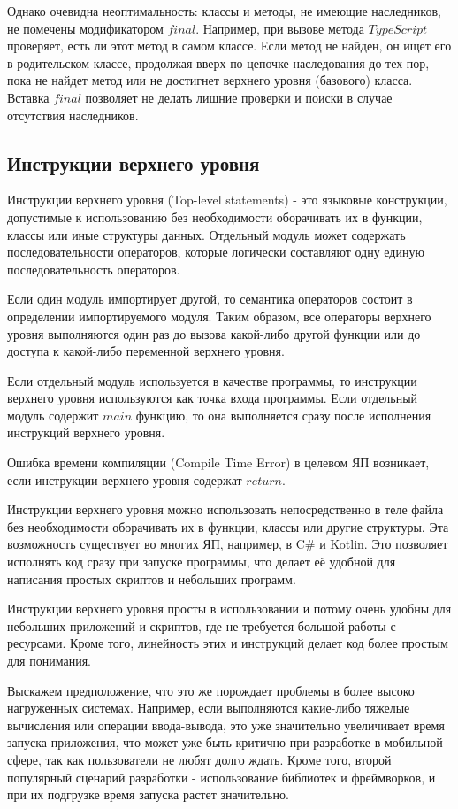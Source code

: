 \documentclass{mipt-thesis-bs}
\begin{document}
Однако очевидна неоптимальность: классы  и методы, не имеющие наследников,
не помечены модификатором $final$. Например, при вызове метода $TypeScript$ проверяет,
есть ли этот метод
в самом классе. Если метод не найден, он ищет его в родительском классе,
продолжая вверх по цепочке наследования до тех пор, пока не найдет метод
или не достигнет верхнего уровня (базового) класса. Вставка $final$ позволяет
не делать лишние проверки и поиски в случае отсутствия наследников.


\subsection{Инструкции верхнего уровня}

Инструкции верхнего уровня (Top-level statements) - это языковые конструкции, допустимые
к использованию без необходимости оборачивать их в функции, классы или иные структуры
данных. Отдельный модуль может содержать последовательности операторов,
которые логически составляют одну единую последовательность операторов.

Если один модуль импортирует другой, то семантика операторов
состоит в определении импортируемого модуля.
Таким образом, все операторы верхнего уровня выполняются один раз до
вызова какой-либо другой функции или до доступа к какой-либо
переменной верхнего уровня.

Если отдельный модуль используется в качестве программы, то инструкции
верхнего уровня используются как точка входа программы. Если отдельный
модуль содержит $main$ функцию, то она выполняется сразу после
исполнения инструкций верхнего уровня.

Ошибка времени компиляции (Compile Time Error) в целевом ЯП возникает, если
инструкции верхнего уровня содержат $return$.

Инструкции верхнего уровня можно использовать
непосредственно в теле файла без необходимости оборачивать их в функции,
классы или другие структуры. Эта возможность существует во многих ЯП, например,
в C\# и Kotlin. Это позволяет исполнять код сразу при запуске программы, что делает её
удобной для написания простых скриптов и небольших программ.

Инструкции верхнего уровня просты в использовании и потому очень удобны
для небольших приложений и скриптов, где не требуется большой работы
с ресурсами. Кроме того, линейность этих и инструкций делает код
более простым для понимания.

Выскажем предположение, что это же порождает проблемы в более
высоко нагруженных системах. Например, если выполняются какие-либо
тяжелые вычисления или операции ввода-вывода, это уже значительно
увеличивает время запуска приложения, что может уже быть критично
при разработке в мобильной сфере, так как пользователи не любят
долго ждать. Кроме того, второй популярный сценарий разработки -
использование библиотек и фреймворков, и при их подгрузке время
запуска растет значительно.
\end{document}
